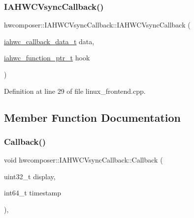 \subsubsection{\texorpdfstring{I\+A\+H\+W\+C\+Vsync\+Callback()}{IAHWCVsyncCallback()}}
{\footnotesize\ttfamily hwcomposer\+::\+I\+A\+H\+W\+C\+Vsync\+Callback\+::\+I\+A\+H\+W\+C\+Vsync\+Callback (\begin{DoxyParamCaption}\item[{\mbox{\hyperlink{iahwc_8h_a07fb4f73baa8a0cfbd40f64071e56a7c}{iahwc\+\_\+callback\+\_\+data\+\_\+t}}}]{data,  }\item[{\mbox{\hyperlink{iahwc_8h_a214bf51cce821fdb7b24210088c12cad}{iahwc\+\_\+function\+\_\+ptr\+\_\+t}}}]{hook }\end{DoxyParamCaption})\hspace{0.3cm}{\ttfamily [inline]}}



Definition at line 29 of file linux\+\_\+frontend.\+cpp.


\begin{DoxyCode}{0}
\end{DoxyCode}


\subsection{Member Function Documentation}
\mbox{\label{classhwcomposer_1_1IAHWCVsyncCallback_a8e89987e4a1f85b917f82166978ede94}} 
\subsubsection{\texorpdfstring{Callback()}{Callback()}}
{\footnotesize\ttfamily void hwcomposer\+::\+I\+A\+H\+W\+C\+Vsync\+Callback\+::\+Callback (\begin{DoxyParamCaption}\item[{uint32\+\_\+t}]{display,  }\item[{int64\+\_\+t}]{timestamp }\end{DoxyParamCaption})\hspace{0.3cm}{\ttfamily [inline]}, {\ttfamily [virtual]}}



